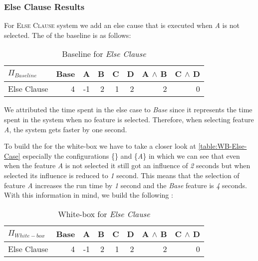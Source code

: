 \subsubsection*{Else Clause Results}

For \textsc{Else Clause} system we add an else cause that is executed when \emph{A} is not selected. 
The \perfInfluenceModel of the baseline is as follows:

\begin{table}[H]
    \centering
    \begin{tabular}{lrrrrrrr}
    \toprule
    $\Pi_{Baseline}$    & Base & A & B & C & D & A $\land$ B & C $\land$ D  \\
    \midrule
    Else Clause &   4 &  -1 &  2 &  1 &  2 &   2 &  0 \\
    \bottomrule
    \end{tabular}
    \caption{Baseline {\perfInfluenceModel} for \emph{Else Clause}}
\end{table}

We attributed the time spent in the else case to \emph{Base} since it represents the time spent in the system when no feature is selected.
Therefore, when selecting feature \emph{A}, the system gets faster by one second. 

\begin{table}[H]
    \centering
    
\end{table}

To build the {\perfInfluenceModel} for the white-box we have to take a closer look at \autoref{table:WB-Else-Case} 
especially the configurations \{\} and \{\emph{A}\} in which we can see that even when the feature \emph{A} is not selected 
it still got an influence of \emph{2} seconds but when selected its influence is reduced to \emph{1} second.
This means that the selection of feature \emph{A} increases the run time by \emph{1} second and the \emph{Base} 
feature is \emph{4} seconds.
With this information in mind, we build the following {\perfInfluenceModel}:

\begin{table}[H]
    \centering
    \begin{tabular}{lrrrrrrr}
    \toprule
    $\Pi_{White-box}$    & Base & A & B & C & D & A $\land$ B & C $\land$ D  \\
    \midrule
    Else Clause &   4 &  -1 &  2 &  1 &  2 &   2 &  0 \\
    \bottomrule
    \end{tabular}
    \caption{White-box {\perfInfluenceModel} for \emph{Else Clause}}
\end{table}

